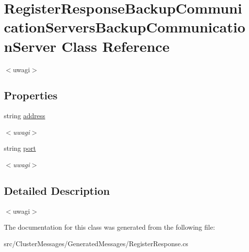 \hypertarget{class_register_response_backup_communication_servers_backup_communication_server}{}\section{Register\+Response\+Backup\+Communication\+Servers\+Backup\+Communication\+Server Class Reference}
\label{class_register_response_backup_communication_servers_backup_communication_server}


$<$uwagi$>$  


\subsection*{Properties}
\begin{DoxyCompactItemize}
\item 
\hypertarget{class_register_response_backup_communication_servers_backup_communication_server_ac4f62f3709a4ac36811be81903cf8c8f}{}string \hyperlink{class_register_response_backup_communication_servers_backup_communication_server_ac4f62f3709a4ac36811be81903cf8c8f}{address}\label{class_register_response_backup_communication_servers_backup_communication_server_ac4f62f3709a4ac36811be81903cf8c8f}

\begin{DoxyCompactList}\small\item\em $<$uwagi$>$ \end{DoxyCompactList}\item 
\hypertarget{class_register_response_backup_communication_servers_backup_communication_server_a014d376a0822484d7a472569b0104bb1}{}string \hyperlink{class_register_response_backup_communication_servers_backup_communication_server_a014d376a0822484d7a472569b0104bb1}{port}\label{class_register_response_backup_communication_servers_backup_communication_server_a014d376a0822484d7a472569b0104bb1}

\begin{DoxyCompactList}\small\item\em $<$uwagi$>$ \end{DoxyCompactList}\end{DoxyCompactItemize}


\subsection{Detailed Description}
$<$uwagi$>$ 

The documentation for this class was generated from the following file\+:\begin{DoxyCompactItemize}
\item 
src/\+Cluster\+Messages/\+Generated\+Messages/Register\+Response.\+cs\end{DoxyCompactItemize}
